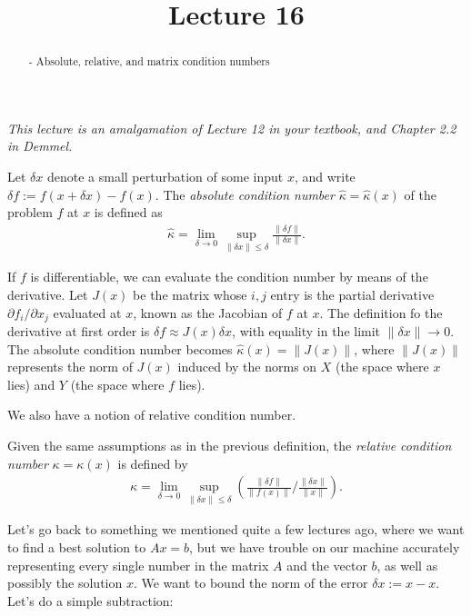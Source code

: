\documentclass{ximera}
\begin{document}
    \title{Lecture 16}
    
    \begin{abstract} 
        - Absolute, relative, and matrix condition numbers
    \end{abstract}
    \maketitle

\textit{This lecture is an amalgamation of Lecture 12 in your textbook, and Chapter 2.2 in Demmel.}

    \begin{definition}
    Let $\delta x$ denote a small perturbation of some input $x$, and write $\delta f := f(x+\delta x) - f(x)$.  
    The \textit{absolute condition number} $\hat{\kappa} = \hat{\kappa}(x)$ of the problem $f$ at $x$ is defined as 
    \begin{align*}
        \hat{\kappa} = \lim\limits_{\delta \to 0} \sup\limits_{\|\delta x\| \leq \delta} \frac{\|\delta f\|}{\|\delta x\|}.
    \end{align*}
    \end{definition}

    
If $f$ is differentiable, we can evaluate the condition number by means of the derivative.  Let $J(x)$ be the matrix whose $i,j$ entry is the partial derivative $\partial f_i/\partial x_j$ evaluated at $x$, known as the Jacobian of $f$ at $x$.  The definition fo the derivative at first order is $\delta f \approx J(x) \delta x$, with equality in the limit $\|\delta x\| \to 0$.  The absolute condition number becomes $\hat{\kappa}(x) = \|J(x)\|$, where $\|J(x)\|$ represents the norm of $J(x)$ induced by the norms on $X$ (the space where $x$ lies) and $Y$ (the space where $f$ lies).

We also have a notion of relative condition number.
\begin{definition}
    Given the same assumptions as in the previous definition, the \textit{relative condition number} $\kappa = \kappa(x)$ is defined by 
    \begin{align*}
        \kappa = \lim\limits_{\delta \to 0} \sup\limits_{\|\delta x\| \leq \delta} \left( \frac{\|\delta f\|}{ \|f(x)\|}\Big/\frac{\|\delta x\|}{\|x\|}
        \right).
    \end{align*}
\end{definition}

Let's go back to something we mentioned quite a few lectures ago, where we want to find a best solution to $Ax = b$, but we have trouble on our machine accurately representing every single number in the matrix $A$ and the vector $b$, as well as possibly the solution $x$.  We want to bound the norm of the error $\delta x:= \hat{x} - x$.  Let's do a simple subtraction:
\end{document}
